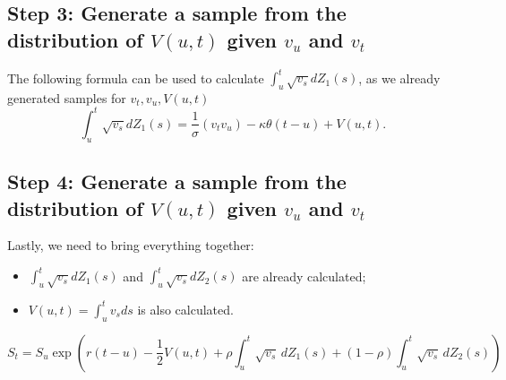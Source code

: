         \subsection*{Step 3: Generate a sample from the distribution of $V(u, t)$ given $v_u$ and $v_t$}
            The following formula can be used to calculate $\int_{u}^t \sqrt{v_s} dZ_1(s)$, as we already generated 
            samples for $v_t , v_u, V(u, t)$
            \begin{equation}
                \int_{u}^t \sqrt{v_s} dZ_1(s) = \frac{1}{\sigma}(v_t v_u) - \kappa\theta(t-u) + V(u, t).
            \end{equation}

        \subsection*{Step 4: Generate a sample from the distribution of $V(u, t)$ given $v_u$ and $v_t$}
            Lastly, we need to bring everything together:
            \begin{itemize}
                \item $\int_{u}^t \sqrt{v_s} dZ_1(s)$ and $\int_{u}^t \sqrt{v_s} dZ_2(s)$ are already calculated;
                \item $V(u, t) = \int_{u}^t v_s ds $ is also calculated.
            \end{itemize}
            \begin{equation}
                S_t = S_u \exp{\left( r(t-u)-\frac{1}{2} V(u, t)  + \rho\int_{u}^{t} \sqrt{v_s} \, dZ_1(s) + (1-\rho)\int_{u}^{t} \sqrt{v_s} \, dZ_2(s)  \right)}
            \end{equation}